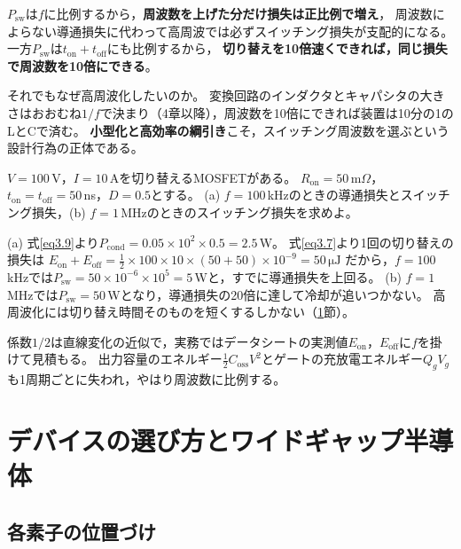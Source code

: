 $P_{\mathrm{sw}}$は$f$に比例するから，\textbf{周波数を上げた分だけ損失は正比例で増え}，
周波数によらない導通損失に代わって高周波では必ずスイッチング損失が支配的になる。
一方$P_{\mathrm{sw}}$は$t_{\mathrm{on}} + t_{\mathrm{off}}$にも比例するから，
\textbf{切り替えを10倍速くできれば，同じ損失で周波数を10倍にできる}。

それでもなぜ高周波化したいのか。
変換回路のインダクタとキャパシタの大きさはおおむね$1/f$で決まり（4章以降），周波数を10倍にできれば装置は10分の1のLとCで済む。
\textbf{小型化と高効率の綱引き}こそ，スイッチング周波数を選ぶという設計行為の正体である。

\begin{例題}[導通損失とスイッチング損失]
\label{rei3.1}
$V = 100$\,V，$I = 10$\,Aを切り替えるMOSFETがある。
$R_{\mathrm{on}} = 50$\,m$\Omega$，$t_{\mathrm{on}} = t_{\mathrm{off}} = 50$\,ns，$D = 0.5$とする。
(a) $f = 100$\,kHzのときの導通損失とスイッチング損失，(b) $f = 1$\,MHzのときのスイッチング損失を求めよ。
\begin{解答}
(a) 式\ref{eq3.9}より$P_{\mathrm{cond}} = 0.05\times10^2\times0.5 = 2.5$\,W。
式\ref{eq3.7}より1回の切り替えの損失は
$E_{\mathrm{on}} + E_{\mathrm{off}} = \frac{1}{2}\times100\times10\times(50+50)\times10^{-9} = 50\,\mathrm{\mu J}$
だから，$f = 100$\,kHzでは$P_{\mathrm{sw}} = 50\times10^{-6}\times10^5 = 5$\,Wと，すでに導通損失を上回る。
(b) $f = 1$\,MHzでは$P_{\mathrm{sw}} = 50$\,Wとなり，導通損失の20倍に達して冷却が追いつかない。
高周波化には切り替え時間そのものを短くするしかない（\ref{sec3.9}節）。
\end{解答}
\end{例題}

係数$1/2$は直線変化の近似で，実務ではデータシートの実測値$E_{\mathrm{on}}$，$E_{\mathrm{off}}$に$f$を掛けて見積もる。
出力容量のエネルギー$\frac{1}{2}C_{\mathrm{oss}}V^2$とゲートの充放電エネルギー$Q_gV_g$も1周期ごとに失われ，やはり周波数に比例する。

\section{デバイスの選び方とワイドギャップ半導体}
\label{sec3.9}

\subsection{各素子の位置づけ}

